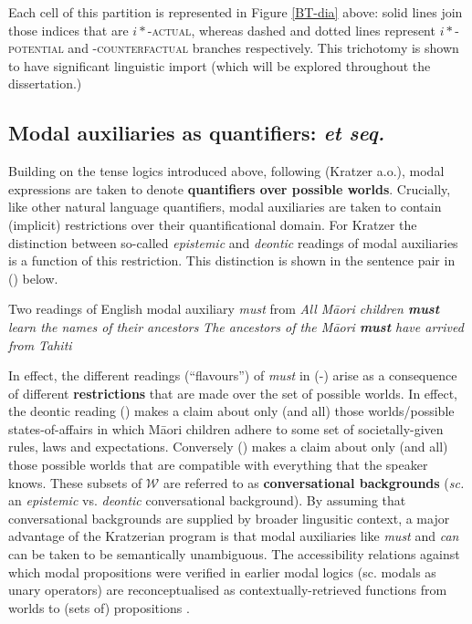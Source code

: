 \documentclass[12pt,dvipsnames]{report}
\begin{document}
\xe

 Each cell of this partition is represented in Figure \ref{BT-dia} above: solid lines join those indices that are \textsc{$ i* $-actual}, whereas dashed and dotted lines represent \textsc{$ i* $-potential} and \textsc{-counterfactual} branches respectively. This trichotomy is shown to have significant linguistic import (which will be explored throughout the dissertation.)

\subsection[Modal auxiliaries as quantifiers]{Modal auxiliaries as quantifiers: \citealt{Kratzer1977} \textit{et seq.}}\label{sec:kratzer}
 Building on the tense logics introduced above, following (Kratzer \citeyear{Kratzer1977,Kratzer1981,Kratzer1991} a.o.), modal expressions are taken to denote \textbf{quantifiers over possible worlds}. Crucially, like other natural language quantifiers, modal auxiliaries are taken to contain (implicit) restrictions over their quantificational domain. For Kratzer the distinction between so-called \textit{epistemic} and \textit{deontic} readings of modal auxiliaries is a function of this restriction. This distinction is shown in the sentence pair in () below.

\pex Two readings of English modal auxiliary \textit{must} from \citet[338]{Kratzer1977}
\a\textit{All Māori children \textbf{must} learn the names of their ancestors}
\a\textit{The ancestors of the Māori \textbf{must} have arrived from Tahiti}
\xe

In effect, the different readings (``flavours'') of \textit{must} in (-) arise as a consequence of different \textbf{restrictions} that are made over the set of possible worlds. In effect, the deontic reading () makes a claim about only (and all) those worlds/possible states-of-affairs in which Māori children adhere to some set of societally-given rules, laws and expectations. Conversely () makes a claim about only (and all) those possible worlds that are compatible with everything that the speaker knows. These subsets of $ \mathcal W$ are referred to as \textbf{conversational backgrounds} (\textit{sc.} an \textit{epistemic} vs. \textit{deontic} conversational background). By assuming that conversational backgrounds are supplied by broader lingusitic context, a major advantage of the Kratzerian program is that modal auxiliaries like \textit{must} and \textit{can} can be taken to be semantically unambiguous. The accessibility relations against which modal propositions were verified in earlier modal logics (sc. modals as unary operators) are reconceptualised as contextually-retrieved functions from worlds to (sets of) propositions \citep*[see][]{Kaufmann2006}. 
\end{document}
